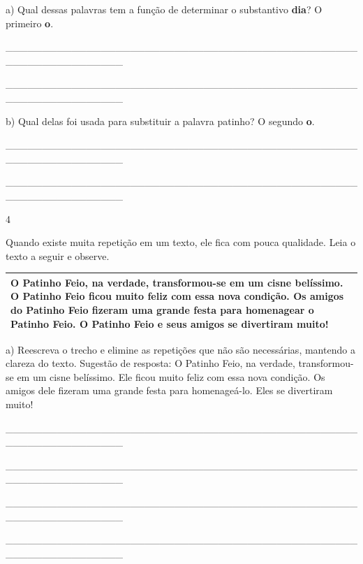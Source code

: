 \begin{escolha}
\begin{escolha}
{a) Qual dessas palavras tem a função de determinar o substantivo
\textbf{dia}? O primeiro \textbf{o}.

\_\_\_\_\_\_\_\_\_\_\_\_\_\_\_\_\_\_\_\_\_\_\_\_\_\_\_\_\_\_\_\_\_\_\_\_\_\_\_\_\_\_\_\_\_\_\_\_\_\_\_\_\_\_\_\_\_\_\_\_\_\_\_\_

\_\_\_\_\_\_\_\_\_\_\_\_\_\_\_\_\_\_\_\_\_\_\_\_\_\_\_\_\_\_\_\_\_\_\_\_\_\_\_\_\_\_\_\_\_\_\_\_\_\_\_\_\_\_\_\_\_\_\_\_\_\_\_\_

b) Qual delas foi usada para substituir a palavra patinho? O segundo
\textbf{o}.

\_\_\_\_\_\_\_\_\_\_\_\_\_\_\_\_\_\_\_\_\_\_\_\_\_\_\_\_\_\_\_\_\_\_\_\_\_\_\_\_\_\_\_\_\_\_\_\_\_\_\_\_\_\_\_\_\_\_\_\_\_\_\_\_

\_\_\_\_\_\_\_\_\_\_\_\_\_\_\_\_\_\_\_\_\_\_\_\_\_\_\_\_\_\_\_\_\_\_\_\_\_\_\_\_\_\_\_\_\_\_\_\_\_\_\_\_\_\_\_\_\_\_\_\_\_\_\_\_

\num{4}

Quando existe muita repetição em um texto, ele fica com pouca qualidade.
Leia o texto a seguir e observe.

\begin{longtable}[]{@{}l@{}}
\toprule
O \textbf{Patinho Feio}, na verdade, transformou-se em um cisne
belíssimo. O \textbf{Patinho Feio} ficou muito feliz com essa nova
condição. Os amigos do \textbf{Patinho Feio} fizeram uma grande festa
para homenagear o \textbf{Patinho Feio}. \textbf{O Patinho Feio e seus
amigos} se divertiram muito!\tabularnewline
\bottomrule
\end{longtable}

a) Reescreva o trecho e elimine as repetições que não são necessárias,
mantendo a clareza do texto. Sugestão de resposta: O Patinho Feio, na
verdade, transformou-se em um cisne belíssimo. Ele ficou muito feliz com
essa nova condição. Os amigos dele fizeram uma grande festa para
homenageá-lo. Eles se divertiram muito!

\_\_\_\_\_\_\_\_\_\_\_\_\_\_\_\_\_\_\_\_\_\_\_\_\_\_\_\_\_\_\_\_\_\_\_\_\_\_\_\_\_\_\_\_\_\_\_\_\_\_\_\_\_\_\_\_\_\_\_\_\_\_\_\_

\_\_\_\_\_\_\_\_\_\_\_\_\_\_\_\_\_\_\_\_\_\_\_\_\_\_\_\_\_\_\_\_\_\_\_\_\_\_\_\_\_\_\_\_\_\_\_\_\_\_\_\_\_\_\_\_\_\_\_\_\_\_\_\_

\_\_\_\_\_\_\_\_\_\_\_\_\_\_\_\_\_\_\_\_\_\_\_\_\_\_\_\_\_\_\_\_\_\_\_\_\_\_\_\_\_\_\_\_\_\_\_\_\_\_\_\_\_\_\_\_\_\_\_\_\_\_\_\_

\_\_\_\_\_\_\_\_\_\_\_\_\_\_\_\_\_\_\_\_\_\_\_\_\_\_\_\_\_\_\_\_\_\_\_\_\_\_\_\_\_\_\_\_\_\_\_\_\_\_\_\_\_\_\_\_\_\_\_\_\_\_\_\_

}
\end{escolha}
\end{escolha}
